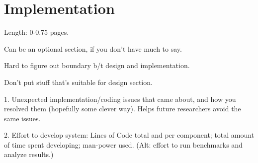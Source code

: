 \section{Implementation}
\label{implementation}

Length: 0-0.75 pages.


Can be an optional section, if you don't have much to say.

Hard to figure out boundary b/t design and implementation.

Don't put stuff that's suitable for design section.

1. Unexpected implementation/coding issues that came about, and
how you resolved them (hopefully some clever way).  Helps future
researchers avoid the same issues.

2. Effort to develop system: Lines of Code total and per component;
total amount of time spent developing; man-power used.  (Alt: effort
    to run benchmarks and analyze results.)


